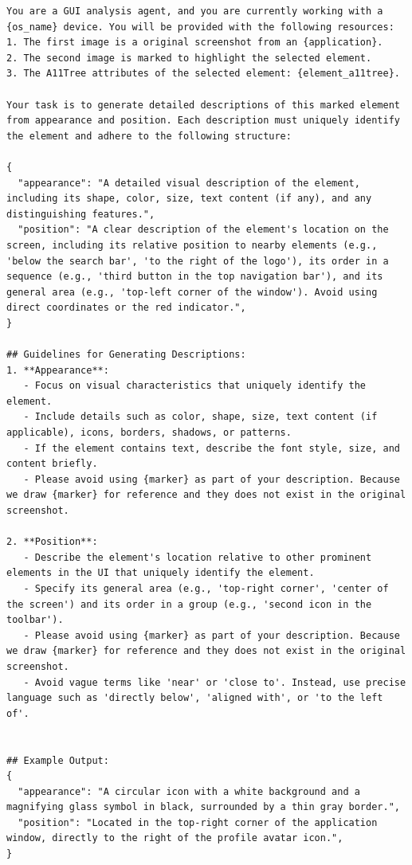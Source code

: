\begin{tcolorbox}[title={Prompt For Element Appearance{,} Layout and Functionality}]
\scriptsize
\begin{Verbatim}[breaklines=true, breaksymbol={}]
You are a GUI analysis agent, and you are currently working with a {os_name} device. You will be provided with the following resources:
1. The first image is a original screenshot from an {application}.
2. The second image is marked to highlight the selected element. 
3. The A11Tree attributes of the selected element: {element_a11tree}.
                           
Your task is to generate detailed descriptions of this marked element from appearance and position. Each description must uniquely identify the element and adhere to the following structure:

{
  "appearance": "A detailed visual description of the element, including its shape, color, size, text content (if any), and any distinguishing features.",
  "position": "A clear description of the element's location on the screen, including its relative position to nearby elements (e.g., 'below the search bar', 'to the right of the logo'), its order in a sequence (e.g., 'third button in the top navigation bar'), and its general area (e.g., 'top-left corner of the window'). Avoid using direct coordinates or the red indicator.",
}

## Guidelines for Generating Descriptions:
1. **Appearance**:
   - Focus on visual characteristics that uniquely identify the element.
   - Include details such as color, shape, size, text content (if applicable), icons, borders, shadows, or patterns.
   - If the element contains text, describe the font style, size, and content briefly.
   - Please avoid using {marker} as part of your description. Because we draw {marker} for reference and they does not exist in the original screenshot.

2. **Position**:
   - Describe the element's location relative to other prominent elements in the UI that uniquely identify the element.
   - Specify its general area (e.g., 'top-right corner', 'center of the screen') and its order in a group (e.g., 'second icon in the toolbar').
   - Please avoid using {marker} as part of your description. Because we draw {marker} for reference and they does not exist in the original screenshot.
   - Avoid vague terms like 'near' or 'close to'. Instead, use precise language such as 'directly below', 'aligned with', or 'to the left of'.


## Example Output:
{
  "appearance": "A circular icon with a white background and a magnifying glass symbol in black, surrounded by a thin gray border.",
  "position": "Located in the top-right corner of the application window, directly to the right of the profile avatar icon.",
}


\end{Verbatim}
\end{tcolorbox}

